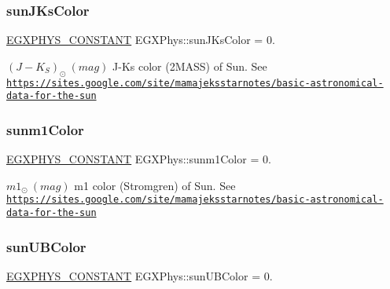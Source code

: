 \subsubsection{\texorpdfstring{sun\+J\+Ks\+Color}{sunJKsColor}}
{\footnotesize\ttfamily \mbox{\hyperlink{group___e_g_x_phys-_constants-_macros_ga76980d288494ce1714c9ac68a95ba702}{E\+G\+X\+P\+H\+Y\+S\+\_\+\+C\+O\+N\+S\+T\+A\+NT}} E\+G\+X\+Phys\+::sun\+J\+Ks\+Color = 0.}

$ (J-K_S)_{\odot} \ (mag)$ J-\/\+Ks color (2\+M\+A\+SS) of Sun. See \href{https://sites.google.com/site/mamajeksstarnotes/basic-astronomical-data-for-the-sun}{\tt https\+://sites.\+google.\+com/site/mamajeksstarnotes/basic-\/astronomical-\/data-\/for-\/the-\/sun} \mbox{\label{group___e_g_x_phys-_constants-_astrophysics-_solar_system-_sun-_magnitude_ga9c9a3c36d5c0a63caf6abbeb092a02d0}} 
\subsubsection{\texorpdfstring{sunm1\+Color}{sunm1Color}}
{\footnotesize\ttfamily \mbox{\hyperlink{group___e_g_x_phys-_constants-_macros_ga76980d288494ce1714c9ac68a95ba702}{E\+G\+X\+P\+H\+Y\+S\+\_\+\+C\+O\+N\+S\+T\+A\+NT}} E\+G\+X\+Phys\+::sunm1\+Color = 0.}

$ m1_{\odot} \ (mag)$ m1 color (Stromgren) of Sun. See \href{https://sites.google.com/site/mamajeksstarnotes/basic-astronomical-data-for-the-sun}{\tt https\+://sites.\+google.\+com/site/mamajeksstarnotes/basic-\/astronomical-\/data-\/for-\/the-\/sun} \mbox{\label{group___e_g_x_phys-_constants-_astrophysics-_solar_system-_sun-_magnitude_ga72d3c19ac2eb5a1b0395ad0f4eed983b}} 
\subsubsection{\texorpdfstring{sun\+U\+B\+Color}{sunUBColor}}
{\footnotesize\ttfamily \mbox{\hyperlink{group___e_g_x_phys-_constants-_macros_ga76980d288494ce1714c9ac68a95ba702}{E\+G\+X\+P\+H\+Y\+S\+\_\+\+C\+O\+N\+S\+T\+A\+NT}} E\+G\+X\+Phys\+::sun\+U\+B\+Color = 0.}

